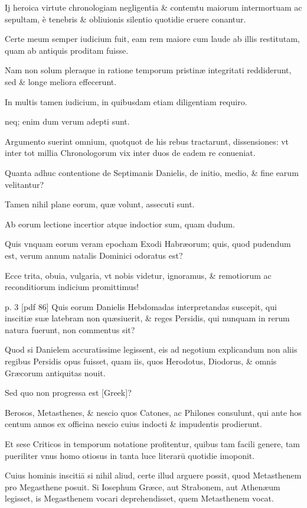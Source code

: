 Ij heroica virtute chronologiam negligentia \& contemtu maiorum
intermortuam ac sepultam, è tenebris \& obliuionis silentio quotidie
eruere conantur.

Certe meum semper iudicium fuit, eam rem maiore
cum laude ab illis restitutam, quam ab antiquis proditam fuisse.

Nam
non solum pleraque in ratione temporum pristinæ integritati reddiderunt,
sed \& longe meliora effecerunt.

In multis tamen iudicium, in quibusdam
etiam diligentiam requiro.

neq; enim dum verum adepti sunt.

Argumento suerint omnium, quotquot de his rebus tractarunt, dissensiones:
vt inter tot millia Chronologorum vix inter duos de eadem re
conueniat.

Quanta adhuc contentione de Septimanis Danielis, de initio,
medio, \& fine earum velitantur?

Tamen nihil plane eorum, quæ volunt,
assecuti sunt.

Ab eorum lectione incertior atque indoctior sum,
quam dudum.

Quis vnquam eorum veram epocham Exodi Habræorum;
quis, quod pudendum est, verum annum natalis Dominici odoratus
est?

Ecce trita, obuia, vulgaria, vt nobis videtur, ignoramus, \& remotiorum
ac reconditiorum indicium promittimus!

%

p. 3 [pdf 86]
%
Quis eorum Danielis 
Hebdomadas interpretandas suscepit, qui inscitiæ suæ latebram
non quæsiuerit, \& reges Persidis, qui nunquam in rerum natura fuerunt,
non commentus sit?

Quod si Danielem accuratissime legissent,
eis ad negotium explicandum non aliis regibus Persidis opus fuisset,
quam iis, quos Herodotus, Diodorus, \& omnis Græcorum antiquitas
nouit.

Sed quo non progressa est \textgreek{[Greek]}?

Berosos, Metasthenes, \&
nescio quos Catones, ac Philones consulunt, qui ante hos centum annos
ex officina nescio cuius indocti \& impudentis prodierunt.

Et sese
Criticos in temporum notatione profitentur, quibus tam facili genere,
tam pueriliter vnus homo otiosus in tanta luce literarū quotidie imoponit.

Cuius hominis inscitiā si nihil aliud, certe illud arguere possit, quod
Metasthenem pro Megasthene posuit. Si Iosephum Græce, aut Strabonem,
aut Athenæum legisset, is Megasthenem vocari deprehendisset,
quem Metasthenem vocat.

